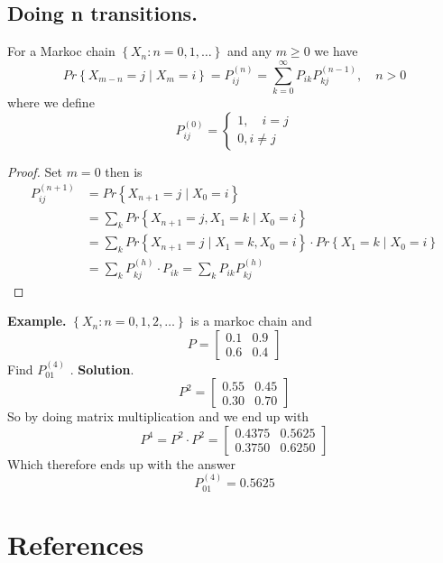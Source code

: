 \documentclass{article}
\theoremstyle{remark}
\begin{document}
 \subsection{Doing n transitions.}%
 \label{sub:doing_n_transitions_}

 \begin{theorem}
   For a Markoc chain $\left\{ X_{n}: n= 0,1, \ldots \right\}$ and any $m\ge 0$ we have \[
     Pr \left \{ X_{m-n} = j  \mid X_{m} = i  \right \}  = P _{ij}^{(n)} =  \sum_{k=0}^{\infty}  P _{ik} P_{kj}^{(n-1)} ,  \quad  n>0 
   \] 
   where we define \[
   P_{ij}^{(0)} = \begin{cases}
     1 , \quad  i= j \\
     0, i \neq j 
   \end{cases}
   \] 
 \end{theorem}

 \begin{proof}
   Set $m = 0$ then is \[
   \begin{split}
     P_{ij }^{(n+1)}   & = Pr \left \{ X_{n+1} = j  \mid  X_{0} = i \right \}   \\
     &= \sum_{k}^{}  Pr \left \{ X_{n+1} = j, X_{1} = k  \mid  X_{0} = i \right \}   \\
     &=  \sum_{k}^{} Pr \left \{ X_{n+1} = j  \mid  X_{1} = k, X_{0} = i \right \} \cdot Pr \left \{ X_{1} = k  \mid  X_{0} = i \right \}   \\
     &= \sum_{k}^{} P_{kj}^{(h)} \cdot P_{ik}  = \sum_{k}^{}  P_{ik} P_{kj}^{(h)}
   \end{split} 
   \] 
 \end{proof}
 
 \begin{tcolorbox}
   \textbf{Example.} $\left\{ X_{n} : n= 0,1,2, \ldots \right\}$ is a markoc chain and \[
   P = \begin{bmatrix} 
   0.1  &  0.9 \\
   0.6  &  0.4 
   \end{bmatrix} 
   \] 
   Find $P_{01}^{(4)}$ .
   \textbf{Solution}. \[
   P^2 = \begin{bmatrix} 
   0.55  &  0.45 \\
   0.30  &  0.70
   \end{bmatrix} 
   \] 
   So by doing matrix multiplication and we end up with \[
   P^{4} = P^{2} \cdot  P^{2} = \begin{bmatrix} 
   0.4375  &  0.5625 \\
   0.3750  &  0.6250
   \end{bmatrix} 
   \] 
   Which therefore ends up with the answer \[
   P_{01}^{(4)} = 0.5625
   \] 
 \end{tcolorbox}
 




\section{References}%
\label{sec:references}





\end{document}
